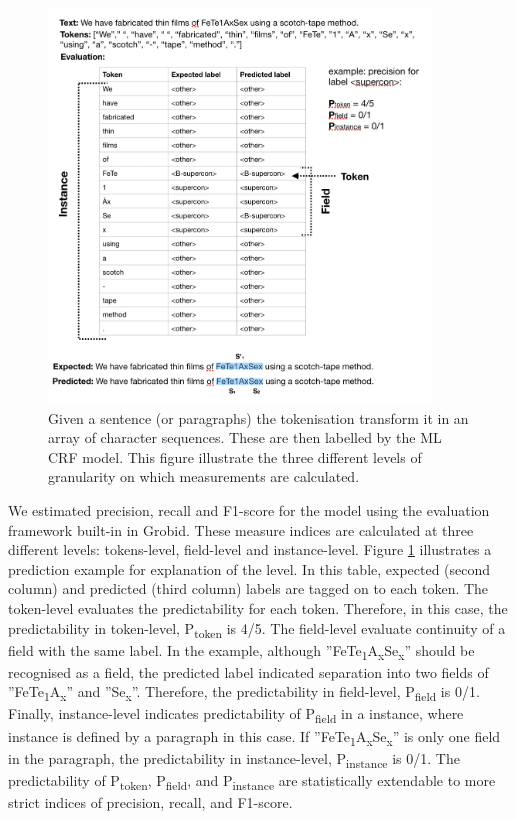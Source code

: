 \documentclass{article}[a4]
\begin{document}
\begin{figure}[h!]
    \centering
    \includegraphics[width=4in]{example-output}
    \caption{Given a sentence (or paragraphs) the tokenisation transform it in an array of character sequences. These are then labelled by the ML CRF model. This figure illustrate the three different levels of granularity on which measurements are calculated.}
    \label{fig:levels-measurement}
\end{figure}

We estimated precision, recall and F1-score for the model using the evaluation framework built-in in Grobid. These measure indices are calculated at three different levels: tokens-level, field-level and instance-level. Figure \ref{fig:levels-measurement} illustrates a prediction example for explanation of the level. 
In this table, expected (second column) and predicted (third column) labels are tagged on to each token. 
The token-level evaluates the predictability for each token. Therefore, in this case, the predictability in token-level, P\textsubscript{token} is 4/5. The field-level evaluate continuity of a field with the same label. In the example, although ”FeTe\textsubscript{1}A\textsubscript{x}Se\textsubscript{x}” should be recognised as a field, the predicted label indicated separation into two fields of ”FeTe\textsubscript{1}A\textsubscript{x}” and ”Se\textsubscript{x}”. Therefore, the predictability in field-level, P\textsubscript{field} is 0/1. Finally, instance-level indicates predictability of P\textsubscript{field} in a instance, where instance is defined by a paragraph in this case. 
If ”FeTe\textsubscript{1}A\textsubscript{x}Se\textsubscript{x}” is only one field in the paragraph, the predictability in instance-level, P\textsubscript{instance} is 0/1. The predictability of P\textsubscript{token}, P\textsubscript{field}, and P\textsubscript{instance} are statistically extendable to more strict indices of precision, recall, and F1-score.
\end{document}
